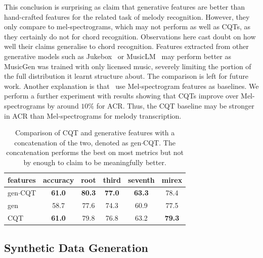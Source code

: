 This conclusion is surprising as \cite{MelodyTranscriptionViaGenerativePreTraining} claim that generative features are better than hand-crafted features for the related task of melody recognition. However, they only compare to mel-spectrograms, which may not perform as well as CQTs, as they certainly do not for chord recognition. Observations here cast doubt on how well their claims generalise to chord recognition. Features extracted from other generative models such as Jukebox~\cite{Jukebox} or MusicLM~\cite{MusicLM} may perform better as MusicGen was trained with only licensed music, severely limiting the portion of the full distribution it learnt structure about. The comparison is left for future work. Another explanation is that~\cite{MelodyTranscriptionViaGenerativePreTraining} use Mel-spectrogram features as baselines. We perform a further experiment with results showing that CQTs improve over Mel-spectrograms by around $10\%$ for ACR. Thus, the CQT baseline may be stronger in ACR than Mel-spectrograms for melody transcription.


\begin{table}
    \centering
    \begin{tabular}{lccccc}
        \toprule
        features & accuracy & root  & third & seventh & mirex \\  
        \midrule
        gen$\cdot$CQT  & \textbf{61.0}     & \textbf{80.3}  & \textbf{77.0}  & \textbf{63.3}    & 78.4  \\
        gen      & 58.7     & 77.6  & 74.3  & 60.9    & 77.5  \\
        CQT      & \textbf{61.0}     & 79.8  & 76.8  & 63.2    & \textbf{79.3}  \\
        \bottomrule
    \end{tabular}
    \caption{Comparison of CQT and generative features with a concatenation of the two, denoted as gen$\cdot$CQT. The concatenation performs the best on most metrics but not by enough to claim to be meaningfully better. }\label{tab:gen_feature_comparison}
\end{table}


\subsection{Synthetic Data Generation}\label{sec:synthetic_data}

